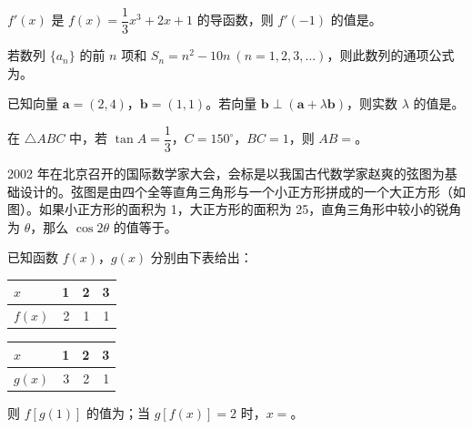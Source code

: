 \begin{question}
$f'(x)$ 是 $f(x)=\dfrac{1}{3}x^3+2x+1$ 的导函数，则 $f'(-1)$ 的值是\gkblank{}。

\end{question}
\begin{question}
若数列 $\{a_n\}$ 的前 $n$ 项和 $S_n=n^2-10n\ (n=1,2,3,\ldots)$，则此数列的通项公式为\gkblank{}。

\end{question}
\begin{question}
已知向量 $\boldsymbol a=(2,4)$，$\boldsymbol b=(1,1)$。若向量 $\boldsymbol b\perp(\boldsymbol a+\lambda\boldsymbol b)$，则实数 $\lambda$ 的值是\gkblank{}。

\end{question}
\begin{question}
在 $\triangle ABC$ 中，若 $\tan A=\dfrac{1}{3}$，$C=150^\circ$，$BC=1$，则 $AB=$\gkblank{}。

\Needspace{0.4\textheight}
\end{question}
\begin{question}
2002 年在北京召开的国际数学家大会，会标是以我国古代数学家赵爽的弦图为基础设计的。弦图是由四个全等直角三角形与一个小正方形拼成的一个大正方形（如图）。如果小正方形的面积为 1，大正方形的面积为 25，直角三角形中较小的锐角为 $\theta$，那么 $\cos 2\theta$ 的值等于\gkblank{}。
\nopagebreak[4]
\begin{center}\end{center}
\nopagebreak[4]
\end{question}
\begin{question}
已知函数 $f(x)$，$g(x)$ 分别由下表给出：

\begin{center}
\begin{tabular}{lrrr}
\toprule
$x$ & 1 & 2 & 3 \\
\midrule
$f(x)$ & 2 & 1 & 1 \\
\bottomrule
\end{tabular}
\end{center}

\begin{center}
\begin{tabular}{lrrr}
\toprule
$x$ & 1 & 2 & 3 \\
\midrule
$g(x)$ & 3 & 2 & 1 \\
\bottomrule
\end{tabular}
\end{center}

则 $f[g(1)]$ 的值为\gkblank{}；当 $g[f(x)]=2$ 时，$x=$\gkblank{}。

\end{question}
